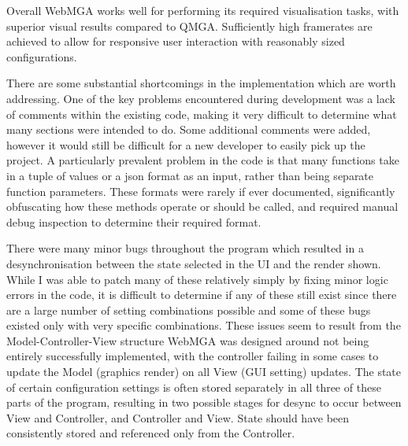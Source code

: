 Overall WebMGA works well for performing its required visualisation tasks, with superior visual results compared to QMGA. Sufficiently high framerates are achieved to allow for responsive user interaction with reasonably sized configurations.

There are some substantial shortcomings in the implementation which are worth addressing. One of the key problems encountered during development was a lack of comments within the existing code, making it very difficult to determine what many sections were intended to do. Some additional comments were added, however it would still be difficult for a new developer to easily pick up the project. A particularly prevalent problem in the code is that many functions take in a tuple of values or a json format as an input, rather than being separate function parameters. These formats were rarely if ever documented, significantly obfuscating how these methods operate or should be called, and required manual debug inspection to determine their required format.

There were many minor bugs throughout the program which resulted in a desynchronisation between the state selected in the UI and the render shown. While I was able to patch many of these relatively simply by fixing minor logic errors in the code, it is difficult to determine if any of these still exist since there are a large number of setting combinations possible and some of these bugs existed only with very specific combinations. These issues seem to result from the Model-Controller-View structure WebMGA was designed around not being entirely successfully implemented, with the controller failing in some cases to update the Model (graphics render) on all View (GUI setting) updates. The state of certain configuration settings is often stored separately in all three of these parts of the program, resulting in two possible stages for desync to occur between View and Controller, and Controller and View. State should have been consistently stored and referenced only from the Controller.
